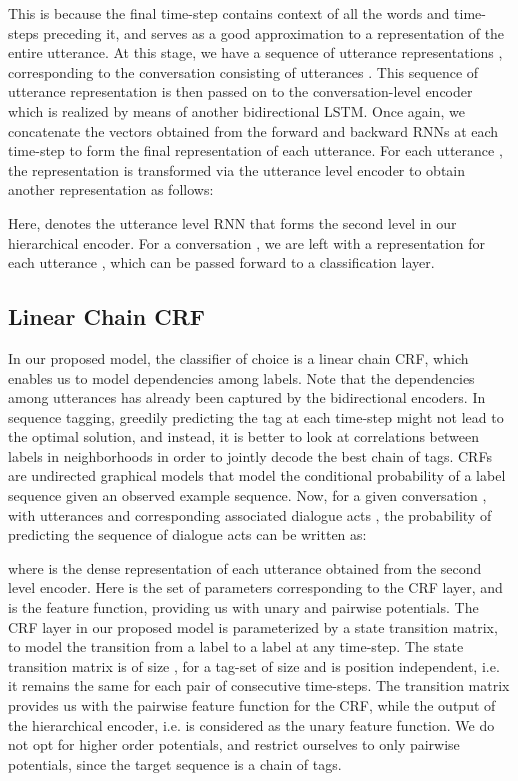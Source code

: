 \documentclass[letterpaper]{article} \usepackage{aaai18}
\begin{document}
This is because the final time-step contains context of all the words and time-steps preceding it, and serves as a good approximation to a representation of the entire utterance. At this stage, we have a sequence of utterance representations , corresponding to the conversation  consisting of utterances . This sequence of utterance representation is then passed on to the conversation-level encoder which is realized by means of another bidirectional LSTM. Once again, we concatenate the vectors obtained from the forward and backward RNNs at each time-step to form the final representation of each utterance. For each utterance , the representation  is transformed via the utterance level encoder to obtain another representation  as follows:

Here,  denotes the utterance level RNN that forms the second level in our hierarchical encoder. For a conversation , we are left with a representation  for each utterance , which can be passed forward to a classification layer.
\subsection{Linear Chain CRF}
In our proposed model, the classifier of choice is a linear chain CRF, which enables us to model dependencies among labels. Note that the dependencies among utterances has already been captured by the bidirectional encoders. In sequence tagging, greedily predicting the tag at each time-step might not lead to the optimal solution, and instead, it is better to look at correlations between labels in neighborhoods in order to jointly decode the best chain of tags. CRFs are undirected graphical models that model the conditional probability of a label sequence given an observed example sequence. Now, for a given conversation , with utterances  and corresponding associated dialogue acts , the probability of predicting the sequence of dialogue acts can be written as:

where  is the dense representation of each utterance  obtained from the second level encoder. Here  is the set of parameters corresponding to the CRF layer, and  is the feature function, providing us with unary and pairwise potentials. The CRF layer in our proposed model is parameterized by a state transition matrix, to model the transition from a label  to a label  at any time-step. The state transition matrix is of size , for a tag-set of size  and is position independent, i.e. it remains the same for each pair of consecutive time-steps. The transition matrix provides us with the pairwise feature function for the CRF, while the output of the hierarchical encoder, i.e.  is considered as the unary feature function. We do not opt for higher order potentials, and restrict ourselves to only pairwise potentials, since the target sequence is a chain of tags.
\end{document}
